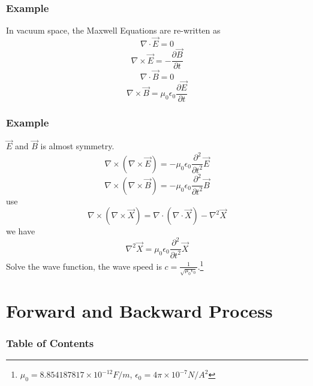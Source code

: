 \documentclass{beamer}
\begin{document}
\begin{frame}
    \frametitle{Example}
    In vacuum space, the Maxwell Equations are re-written as
    \begin{equation}
        \nabla \cdot \vec{E} = 0
    \end{equation}
    \begin{equation}
        \nabla \times \vec{E} = - \frac{\partial{\vec{B}}}{\partial{t}}
    \end{equation}
    \begin{equation}
        \nabla \cdot \vec{B} = 0
    \end{equation}
    \begin{equation}
        \nabla \times \vec{B} = \mu_{0} \epsilon_{0} \frac{\partial{\vec{E}}}{\partial{t}}
    \end{equation}
\end{frame}

\begin{frame}
    \frametitle{Example}
    $\vec{E}$ and $\vec{B}$ is almost symmetry.
    \begin{equation}
        \nabla \times (\nabla \times \vec{E}) =
        - \mu_{0} \epsilon_{0} \frac{\partial^{2}}{\partial{t^{2}}} \vec{E}
    \end{equation}
    \begin{equation}
        \nabla \times (\nabla \times \vec{B}) = - \mu_{0} \epsilon_{0} \frac{\partial^{2}}{\partial{t^{2}}} \vec{B}
    \end{equation}
    use
    \begin{equation}
        \nabla \times (\nabla \times \vec{X}) =
        \nabla \cdot (\nabla \cdot \vec{X}) - \nabla^{2} \vec{X}
    \end{equation}
    we have
    \begin{equation}
        \nabla^{2} \vec{X} = \mu_{0} \epsilon_{0} \frac{\partial^{2}}{\partial{t^{2}}} \vec{X}
    \end{equation}
    Solve the wave function, the wave speed is $c=\frac{1}{\sqrt{\mu_{0} \epsilon_{0}}}$.\footnote{$\mu_{0}=8. 854187817 \times 10^{-12} F/m$, $\epsilon_{0}=4 \pi \times 10^{-7} N/A^{2}$}
\end{frame}

\section{Forward and Backward Process}

\begin{frame}
    \frametitle{Table of Contents}
    \tableofcontents[currentsection]
\end{frame}
\end{document}
